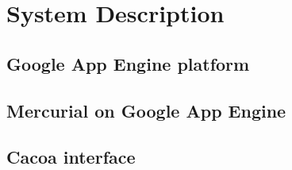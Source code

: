 \chapter{System Description}\label{chap:sys_description}
\section{Google App Engine platform}\label{sec:gae}
\section{Mercurial on Google App Engine}\label{sec:hg_on_gae}
\section{Cacoa interface}\label{sec:cacoa} 
